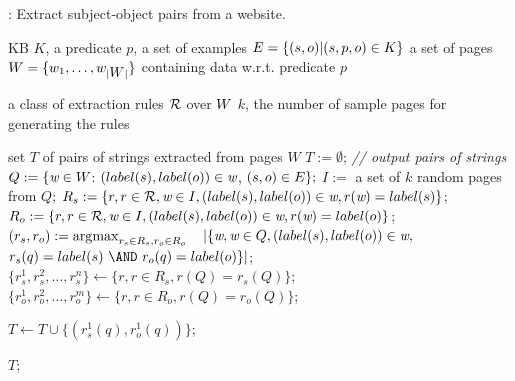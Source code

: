 \begin{algorithm}[htb!]
\caption{{\alfrex}: Extract subject-object pairs from a website.}\label{lst:learning-wrappers}
\label{alg:alfrex}
\begin{algorithmic}[1]
\renewcommand{\algorithmicensure}{\textbf{Output:}}
\newcommand{\LET}{\mbox{\textbf{let}}}
\renewcommand{\algorithmicrequire}{\textbf{Input:}}
\REQUIRE \ac{KB} $K$, a predicate $p$, a set of examples $\mbox{\ensuremath{E}} = \{(s,o)|(s,p,o) \in K\}$
\REQUIRE a set of pages $\mbox{\ensuremath{W}}=\{w_1,\ldots,w_{|\mbox{\ensuremath{W}}|}\}$ containing data w.r.t. predicate $p$

\renewcommand{\algorithmicrequire}{\textbf{Parameter:}}
\REQUIRE a class of extraction rules $\mathcal{R}$ over $\mbox{\ensuremath{W}}$
\REQUIRE $k$, the number of sample pages for generating the rules

\ENSURE set $T$ of pairs of strings extracted from pages $W$
\bigskip
\STATE $T := \emptyset$; {\em // output pairs of strings}
\STATE $Q := \{\mbox{\em w} \in \mbox{\ensuremath{W}}$: $(label(s),label(o)) \in \mbox{\em w}$, $ (s, o) \in \mbox{\ensuremath{E}}\};$\label{lst:Q}
\STATE $I :=$ a set of $k$ random pages from $Q$;\label{lst:I}
\STATE $R_s := \{r, r \in \mathcal{R}, \mbox{\em w} \in I, (label(s), label(o)) \in \mbox{\em w}, r(\mbox{\em w}) = label(s)\}$;\label{lst:Rs}
\STATE $R_o := \{r, r \in \mathcal{R}, \mbox{\em w} \in I, (label(s), label(o)) \in \mbox{\em w}, r(\mbox{\em w}) = label(o)\}$;\label{lst:Ro}
\STATE $(r_s, r_o) := \operatorname*{\arg\!\max}_{r_s\in R_s, r_o \in R_o}$~~$|\{\mbox{\em w}, \mbox{\em w} \in Q, (label(s),label(o)) \in \mbox{\em w},$\\$ r_s(q) = \lab{s}\ \AND\ r_o(q) = \lab{o}\}|$;\label{lst:best-pair}
\STATE $\{r_s^1,r_s^2,\ldots, r_s^n\} \leftarrow \{r, r \in R_s, r(Q)=r_s(Q) \}$;\label{lst:best-vector-s}
\STATE $\{r_o^1,r_o^2,\ldots, r_o^m\} \leftarrow \{r, r \in R_o, r(Q)=r_o(Q) \}$;\label{lst:best-vector-o}

\label{lst:forall-start}
    \label{lst:check}
    \STATE $T \leftarrow T \cup \{(r_s^1(q),r_o^1(q))\}$;
    \ENDIF
\ENDFOR\label{lst:forall-end}

\RETURN $T$;

\end{algorithmic}
\end{algorithm}


